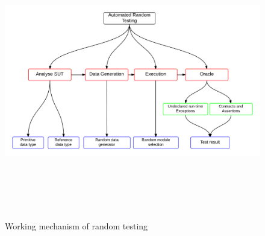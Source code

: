 \begin{figure}[h]
	\centering
	\centerline{\includegraphics[width=16cm, height=12cm ]{chapter2/randomTestingMechanism.png}}
	\bigskip
	\caption{Working mechanism of random testing}
	\label{fig:workingmechanism}
\end{figure}
\bigskip
\bigskip
